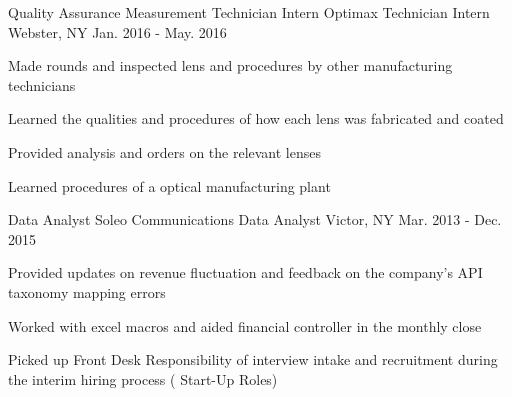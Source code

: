 \begin{cventries}
  \cventry
    {Quality Assurance Measurement Technician Intern}
    {Optimax Technician Intern}
    {Webster, NY}
    {Jan. 2016 - May. 2016}
    {
      \begin{cvitems}
        \item {Made rounds and inspected lens and procedures by other manufacturing technicians}
        \item{Learned the qualities and procedures of how each lens was fabricated and coated}
        \item{Provided analysis and orders on the relevant lenses}
        \item{Learned procedures of a optical manufacturing plant}
      \end{cvitems}
    }    

    
  \cventry
    {Data Analyst}
    {Soleo Communications Data Analyst}
    {Victor, NY}
    {Mar. 2013 - Dec. 2015}
    {
      \begin{cvitems}
        \item {Provided updates on revenue fluctuation and feedback on the company's API taxonomy mapping errors}
        \item{Worked with excel macros and aided financial controller in the monthly close}
        \item{Picked up Front Desk Responsibility of interview intake and recruitment during the interim hiring process ( Start-Up Roles)}
      \end{cvitems}
    }    
\end{cventries}

